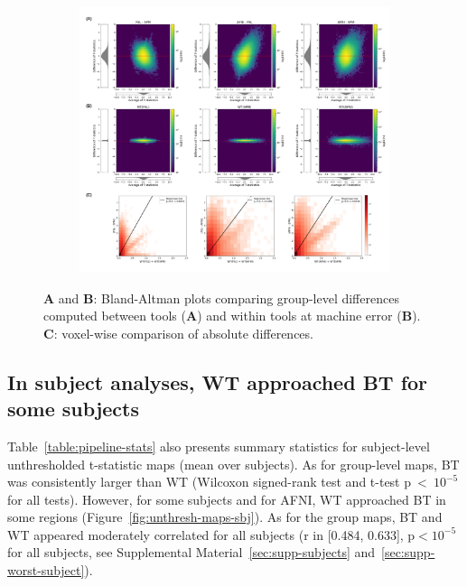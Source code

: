\documentclass[11pt,onecolumn]{article}
\begin{document}
\begin{figure}[ht]
  \centering
  \begin{subfigure}[ht]{.9\textwidth}
    \centering
    \includegraphics[width=.9\textwidth]{figures/gl-unthresh.png}
  \end{subfigure}
  \caption{\textbf{A} and \textbf{B}: Bland-Altman plots comparing group-level differences computed between tools
    (\textbf{A}) and within tools at machine error (\textbf{B}). \textbf{C}: voxel-wise comparison of absolute differences.}
  \label{fig:unthresh-maps}
\end{figure}


\subsection{In subject analyses, WT approached BT for some subjects}

Table~\ref{table:pipeline-stats} also presents summary statistics for
subject-level unthresholded t-statistic maps (mean over subjects).
As for group-level maps, BT was consistently larger than WT (Wilcoxon
signed-rank test and t-test p~\textless~$10^{-5}$ for all tests).
However, for
some subjects and for AFNI, WT approached 
BT in some regions (Figure~\ref{fig:unthresh-maps-sbj}). As for the group maps, BT and WT
 appeared moderately correlated for all subjects (r in [0.484,
    0.633], p$< 10^{-5}$ for all subjects, see Supplemental Material~\ref{sec:supp-subjects} and~\ref{sec:supp-worst-subject}).
\end{document}
